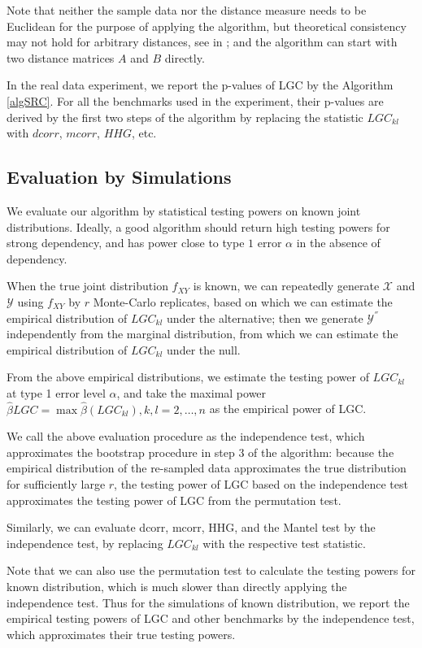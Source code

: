 \documentclass[11pt]{article}
\begin{document}
Note that neither the sample data nor the distance measure needs to be Euclidean for the purpose of applying the algorithm, but theoretical consistency may not hold for arbitrary distances, see in \cite{Lyons2013}; and the algorithm can start with two distance matrices $A$ and $B$ directly.

In the real data experiment, we report the p-values of LGC by the  Algorithm \ref{algSRC}. For all the benchmarks used in the experiment, their p-values are derived by the first two steps of the algorithm by replacing the statistic $LGC_{kl}$ with $dcorr$, $mcorr$, $HHG$, etc. 

\subsection{Evaluation by Simulations}

We evaluate our algorithm by statistical testing powers on known joint distributions. Ideally, a good algorithm should return high testing powers for strong dependency, and has power close to type $1$ error $\alpha$ in the absence of dependency.

When the true joint distribution $f_{XY}$ is known, we can repeatedly generate $\mathcal{X}$ and $\mathcal{Y}$ using $f_{XY}$ by $r$ Monte-Carlo replicates, based on which we can estimate the empirical distribution of $LGC_{kl}$ under the alternative; then we generate $\mathcal{Y}^{''}$ independently from the marginal distribution, from which we can estimate the empirical distribution of $LGC_{kl}$ under the null.

From the above empirical distributions, we estimate the testing power of $LGC_{kl}$ at type 1 error level $\alpha$, and take the maximal power $\hat{\beta}{LGC}=\max{\hat{\beta}(LGC_{kl}), k,l=2, \ldots,n}$ as the empirical power of LGC. 

We call the above evaluation procedure as the independence test, which approximates the bootstrap procedure in step 3 of the algorithm: because the empirical distribution of the re-sampled data approximates the true distribution for sufficiently large $r$, the testing power of LGC based on the independence test approximates the testing power of LGC from the permutation test.

Similarly, we can evaluate dcorr, mcorr, HHG, and the Mantel test by the independence test, by replacing $LGC_{kl}$ with the respective test statistic. 

Note that we can also use the permutation test to calculate the testing powers for known distribution, which is much slower than directly applying the independence test.
Thus for the simulations of known distribution, we report the empirical testing powers of LGC and other benchmarks by the independence test, which approximates their true testing powers.
\end{document}
